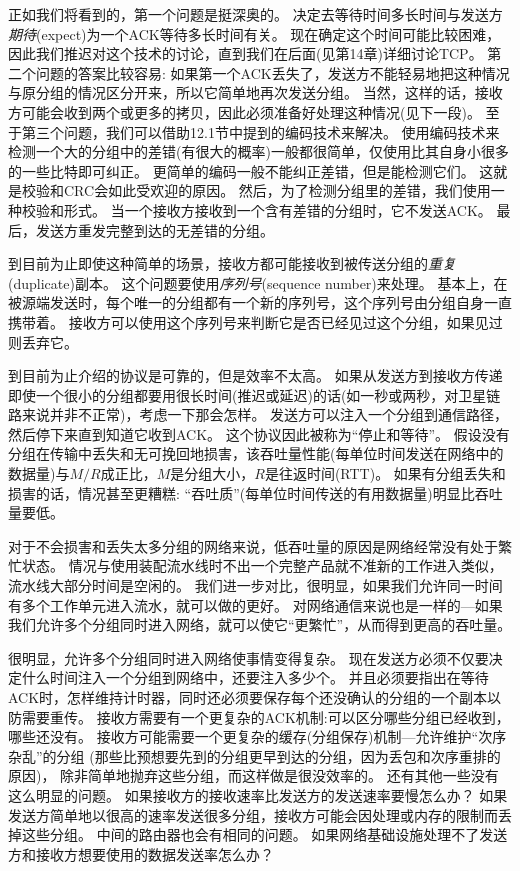 \documentclass{../main.tex}{subfiles}
\begin{document}
正如我们将看到的，第一个问题是挺深奥的。
决定去等待时间多长时间与发送方\emph{期待}(expect)为一个ACK等待多长时间有关。 %
现在确定这个时间可能比较困难，因此我们推迟对这个技术的讨论，直到我们在后面(见第14章)详细讨论TCP。
第二个问题的答案比较容易: 如果第一个ACK丢失了，发送方不能轻易地把这种情况与原分组的情况区分开来，所以它简单地再次发送分组。
当然，这样的话，接收方可能会收到两个或更多的拷贝，因此必须准备好处理这种情况(见下一段)。
至于第三个问题，我们可以借助12.1节中提到的编码技术来解决。
使用编码技术来检测一个大的分组中的差错(有很大的概率)一般都很简单，仅使用比其自身小很多的一些比特即可纠正。
更简单的编码一般不能纠正差错，但是能检测它们。
这就是校验和CRC会如此受欢迎的原因。
然后，为了检测分组里的差错，我们使用一种校验和形式。
当一个接收方接收到一个含有差错的分组时，它不发送ACK。
最后，发送方重发完整到达的无差错的分组。

到目前为止即使这种简单的场景，接收方都可能接收到被传送分组的\emph{重复}(duplicate)副本。
这个问题要使用\emph{序列号}(sequence number)来处理。
基本上，在被源端发送时，每个唯一的分组都有一个新的序列号，这个序列号由分组自身一直携带着。
接收方可以使用这个序列号来判断它是否已经见过这个分组，如果见过则丢弃它。

到目前为止介绍的协议是可靠的，但是效率不太高。
如果从发送方到接收方传递即使一个很小的分组都要用很长时间(推迟或延迟)的话(如一秒或两秒，对卫星链路来说并非不正常)，考虑一下那会怎样。
发送方可以注入一个分组到通信路径，然后停下来直到知道它收到ACK。
这个协议因此被称为``停止和等待''。
假设没有分组在传输中丢失和无可挽回地损害，该吞吐量性能(每单位时间发送在网络中的数据量)与$M/R$成正比，$M$是分组大小，$R$是往返时间(RTT)。
如果有分组丢失和损害的话，情况甚至更糟糕: “吞吐质”(每单位时间传送的有用数据量)明显比吞吐量要低。

对于不会损害和丢失太多分组的网络来说，低吞吐量的原因是网络经常没有处于繁忙状态。
情况与使用装配流水线时不出一个完整产品就不准新的工作进入类似，流水线大部分时间是空闲的。
我们进一步对比，很明显，如果我们允许同一时间有多个工作单元进入流水，就可以做的更好。
对网络通信来说也是一样的---如果我们允许多个分组同时进入网络，就可以使它``更繁忙''，从而得到更高的吞吐量。

很明显，允许多个分组同时进入网络使事情变得复杂。
现在发送方必须不仅要决定什么时间注入一个分组到网络中，还要注入多少个。
并且必须要指出在等待ACK时，怎样维持计时器，同时还必须要保存每个还没确认的分组的一个副本以防需要重传。
接收方需要有一个更复杂的ACK机制:可以区分哪些分组已经收到，哪些还没有。
接收方可能需要一个更复杂的缓存(分组保存)机制---允许维护``次序杂乱''的分组
(那些比预想要先到的分组更早到达的分组，因为丢包和次序重排的原因)，
除非简单地抛弃这些分组，而这样做是很没效率的。
还有其他一些没有这么明显的问题。
如果接收方的接收速率比发送方的发送速率要慢怎么办？
如果发送方简单地以很高的速率发送很多分组，接收方可能会因处理或内存的限制而丢掉这些分组。
中间的路由器也会有相同的问题。
如果网络基础设施处理不了发送方和接收方想要使用的数据发送率怎么办？
\end{document}
